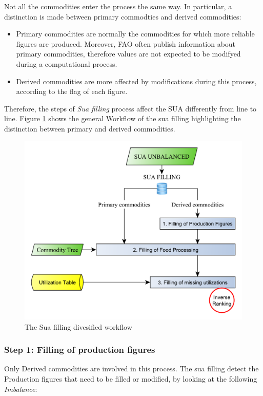 \documentclass[]{article}
\providecommand{\tightlist}{%
  \setlength{\itemsep}{0pt}\setlength{\parskip}{0pt}}
\begin{document}
Not all the commodities enter the process the same way. In particular, a
distinction is made between primary commodties and derived commodities:

\begin{itemize}
\tightlist
\item
  Primary commodities are normally the commodities for which more
  reliable figures are produced. Moreover, FAO often publish information
  about primary commodities, therefore values are not expected to be
  modifyed during a computational process.
\item
  Derived commodities are more affected by modifications during this
  process, according to the flag of each figure.
\end{itemize}

Therefore, the steps of \emph{Sua filling} process affect the SUA
differently from line to line. Figure \ref{fig:f4} shows the general
Workflow of the sua filling highlighting the distinction between primary
and derived commodities.

\begin{figure}

{\centering \includegraphics[width=0.65\linewidth]{images/04_SuaFilling2} 

}

\caption{\label{fig:f4}The Sua filling divesified workflow}\label{fig:f4}
\end{figure}

\subsubsection*{Step 1: Filling of production
figures}\label{step-1-filling-of-production-figures}

Only Derived commodities are involved in this process. The sua filling
detect the Production figures that need to be filled or modified, by
looking at the following \emph{Imbalance}:
\end{document}
